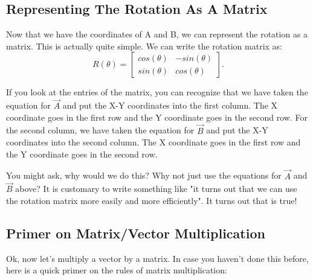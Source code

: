\documentclass[11pt]{article}
\begin{document}
\subsection{Representing The Rotation As A Matrix}

Now that we have the coordinates of A and B, we can represent the rotation as a matrix.  This
is actually quite simple.  We can write the rotation matrix as:
\begin{equation}
    R(\theta) = 
    \begin{bmatrix}
    cos(\theta) & -sin(\theta) \\
    sin(\theta) & cos(\theta)
    \end{bmatrix}.
\end{equation}

If you look at the entries of the matrix, you can recognize that we have taken the equation 
for $\vec{A}$ and put the X-Y coordinates into the first column.  The X coordinate goes in
the first row and the Y coordinate goes in the second row.  For the second column, we have
taken the equation for $\vec{B}$ and put the X-Y coordinates into the second column.
The X coordinate goes in the first row and the Y coordinate goes in the second row.

You might ask, why would we do this?  Why not just use the equations for $\vec{A}$ and $\vec{B}$ above?
It is customary to write something like "it turns out that we can use the rotation matrix more
easily and more efficiently".  It turns out that is true!

\subsection{Primer on Matrix/Vector Multiplication}

Ok, now let’s multiply a vector by a matrix.  In case you haven’t done this before, here is 
a quick primer on the rules of matrix multiplication:
\end{document}
